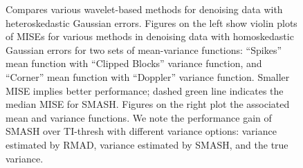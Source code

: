 \documentclass[12pt]{article}
\begin{document}
\begin{figure}
\begin{subfigure}[b]{0.65\textwidth}
        \caption{}
        \label{fig:gaus_hetero_2}
    \end{subfigure}
		\hfill
    \begin{subfigure}[b]{0.3\textwidth}
        \centering
        \caption{}
        \label{fig:gaus_hetero_sd_2}
    \end{subfigure}
    \caption{Compares various wavelet-based methods for denoising data with heteroskedastic Gaussian errors. Figures on the left show violin plots of MISEs for various methods in denoising data with homoskedastic Gaussian errors for two sets of mean-variance functions: ``Spikes'' mean function with ``Clipped Blocks'' variance function, and ``Corner'' mean function with ``Doppler'' variance function. Smaller MISE implies better performance; dashed green line indicates the median MISE for SMASH. Figures on the right plot the associated mean and variance functions. We note the performance gain of SMASH over TI-thresh with different variance options: variance estimated by RMAD, variance estimated by SMASH, and the true variance.}
    \label{fig:gaus_hetero}
\end{figure}
\end{document}
